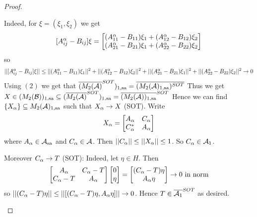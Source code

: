 \documentclass[10pt,english,a4paper]{article}
\theoremstyle{definition}
\def\sa{\text{sa}}
\begin{document}
\begin{proof}
\begin{enumerate}[(1)]
Indeed, for $\xi = (\xi_1,\xi_2)$ we get 
\[ [A_{ij}^{\alpha} - B_{ij}]\xi = \begin{bmatrix}(A_{11}^{\alpha} - B_{11})\xi_1 + (A_{12}^{\alpha}-B_{12}
)\xi_2 \\  (A_{21}^{\alpha} - B_{21})\xi_1 + (A_{22}^{\alpha}-B_{22}
)\xi_2  \end{bmatrix} \]
so 
\[ ||[A_{ij}^{\alpha}- B_{ij}]\xi|| \leq ||(A_{11}^{\alpha}-B_{11})\xi_1||^2 + 
||(A_{12}^{\alpha}-B_{12})\xi_2||^2
+ ||(A_{21}^{\alpha}-B_{21})\xi_1||^2
+ ||(A_{22}^{\alpha}-B_{22})\xi_2||^2 \to 0
\]
Using $(2)$ we get that $\ol{(M_{2}(\As)}^{SOT})_{1,\sa}
 = \ol{(M_2(\As)_{1,\sa})^{SOT}}$
Thus we get $X \in (M_2(\Bs))_{1,\sa}\subseteq (\ol{M_2(\As)}^{SOT})_{1,\sa}
= \ol{(M_2(\As))_{1,\sa}}^{SOT}$
Hence we can find $\{X_{\al}\} \subseteq M_2(\As)_{1,\sa}$ such that 
$X_{\alpha}\to X$ (SOT).
Write 
\[ X_{\alpha} = \begin{bmatrix} A_{\alpha} & C_{\alpha} \\ C_{\alpha}^{*} &A_{\alpha} \end{bmatrix} \]
where $A_{\al} \in \As_{\sa}$ and $C_{\alpha} \in \mathcal{A}$. 
Then $||C_{\alpha}|| \leq ||X_{\alpha}|| \leq 1$. So $C_{\alpha}\in \mathcal{A}_{1}$.

Moreover $C_{\alpha}\to T$ (SOT):
Indeed, let $\eta\in H$.
Then 
\[ \begin{bmatrix} A_{\alpha} & C_{\alpha} -T \\ C_{\alpha}-T & A_{\alpha} \end{bmatrix} 
\begin{bmatrix} 0 \\ \eta \end{bmatrix}
= \begin{bmatrix} (C_{\alpha}-T)\eta \\ A_{\alpha}\eta \end{bmatrix}
\to 0 \text{ in norm}\]
so $||(C_{\alpha}-T)\eta|| \leq ||[(C_{\alpha}-T)\eta, A_{\alpha}\eta ]|| \to 0$.
Hence $T \in \overline{\mathcal{A}_1}^{SOT}$ as desired. 

\end{enumerate}

\end{proof}
\end{document}
